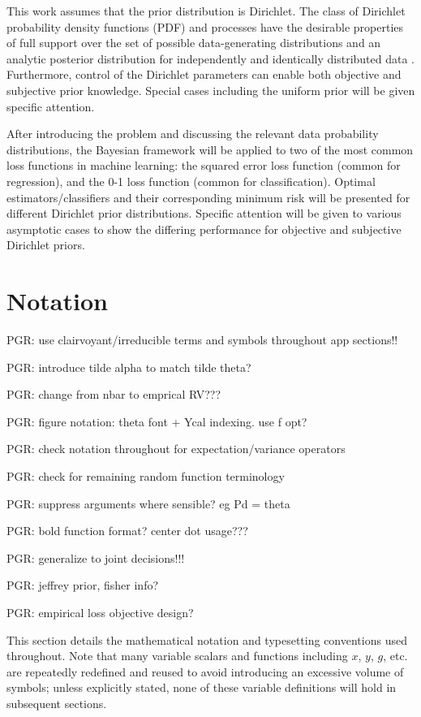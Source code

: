 \documentclass[12pt]{report}
\begin{document}
This work assumes that the prior distribution is Dirichlet. The class of Dirichlet probability density functions (PDF) and processes have the desirable properties of full support over the set of possible data-generating distributions and an analytic posterior distribution for independently and identically distributed data \cite{ferguson}. Furthermore, control of the Dirichlet parameters can enable both objective and subjective prior knowledge. Special cases including the uniform prior will be given specific attention.

After introducing the problem and discussing the relevant data probability distributions, the Bayesian framework will be applied to two of the most common loss functions in machine learning: the squared error loss function (common for regression), and the 0-1 loss function (common for classification). Optimal estimators/classifiers and their corresponding minimum risk will be presented for different Dirichlet prior distributions. Specific attention will be given to various asymptotic cases to show the differing performance for objective and subjective Dirichlet priors.




\section{Notation}

PGR: use clairvoyant/irreducible terms and symbols throughout app sections!!

PGR: introduce tilde alpha to match tilde theta?

PGR: change from nbar to emprical RV???


PGR: figure notation: theta font + Ycal indexing. use f opt?

PGR: check notation throughout for expectation/variance operators

PGR: check for remaining random function terminology


PGR: suppress arguments where sensible? eg Pd = theta

PGR: bold function format? center dot usage???


PGR: generalize to joint decisions!!!


PGR: jeffrey prior, fisher info?

PGR: empirical loss objective design?





This section details the mathematical notation and typesetting conventions used throughout. Note that many variable scalars and functions including $x$, $y$, $g$, etc. are repeatedly redefined and reused to avoid introducing an excessive volume of symbols; unless explicitly stated, none of these variable definitions will hold in subsequent sections.
\end{document}
